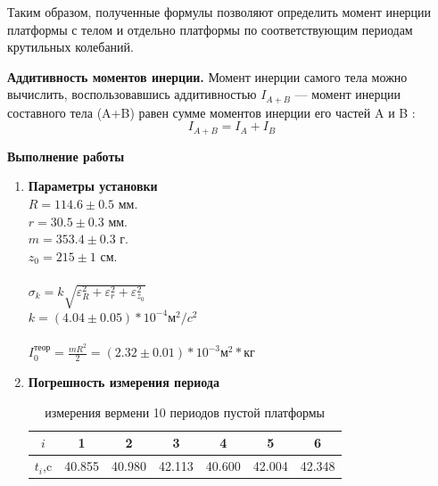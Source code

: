 \documentclass[12pt]{article}
\begin{document}
    Таким образом, полученные формулы позволяют определить момент
    инерции платформы с телом и отдельно платформы по соответствующим периодам крутильных колебаний.

    \textbf{Аддитивность моментов инерции.} Момент инерции самого тела можно вычислить, воспользовавшись аддитивностью $I_{A+B}$ — момент инерции составного тела (A+B) равен сумме моментов инерции его частей A и B :
        \begin{equation}
            I_{A+B} = I_A + I_B
        \end{equation}
        
        
        
       
    
    \textbf{\large Выполнение работы}
    \begin{enumerate} 
        \item \textbf{Параметры установки} \\\newline
            $R = 114.6 \pm 0.5$ мм. \\ $r = 30.5 \pm 0.3$ мм.\\
            $m = 353.4 \pm 0.3$ г. \\ $z_0 = 215 \pm 1$ см.\\ \\
            $\sigma_k = k \sqrt{\varepsilon_R^2 + \varepsilon_r^2 + \varepsilon_{z_0}^2}$ \\
            $ k = (4.04 \pm 0.05)* 10 ^ {-4} м^2/c^2$ \\ \\
            $I_0^{теор} = \frac{m R^2}{2} = (2.32 \pm 0.01) * 10 ^{-3} м^2 * кг$

       \item \textbf{Погрешность измерения периода} \\\newline
	       \begin{table}[ht]
	       	\caption{измерения вермени 10 периодов пустой платформы}
	       	\begin{center}
	       		\begin{tabular}{|c|c|c|c|c|c|c|}
	       			\hline 
	       			$i$ & 1 & 2 & 3 & 4 & 5 & 6 \\
	       			\hline
	       			$t_i$,c & 40.855 & 40.980 & 42.113 & 40.600 & 42.004 & 42.348 \\
	       			\hline
	       		\end{tabular}
	       	\end{center}
	       \end{table}
	       

\end{enumerate}
\end{document}
